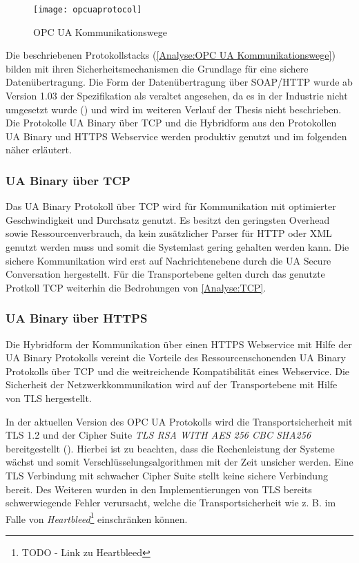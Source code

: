 \begin{figure}[h]
  \centering
  \texttt{[image: opcuaprotocol]}
  \caption{OPC UA Kommunikationswege} 
  \label{Analyse:OPC UA Kommunikationswege}
\end{figure}

\clearpage

Die beschriebenen Protokollstacks (\autoref{Analyse:OPC UA Kommunikationswege}) bilden mit ihren Sicherheitsmechanismen die Grundlage für eine sichere Datenübertragung. Die Form der Datenübertragung über \ac{SOAP}/\ac{HTTP} wurde ab Version 1.03 der Spezifikation als veraltet angesehen, da es in der Industrie nicht umgesetzt wurde (\cite{opcpt5}) und wird im weiteren Verlauf der Thesis nicht beschrieben. Die Protokolle \ac{UA} Binary über \ac{TCP} und die Hybridform aus den Protokollen \ac{UA} Binary und \ac{HTTPS} Webservice werden produktiv genutzt und im folgenden näher erläutert.

\subsubsection{\ac{UA} Binary über \ac{TCP}}
Das \ac{UA} Binary Protokoll über \ac{TCP} wird für Kommunikation mit optimierter Geschwindigkeit und Durchsatz genutzt. Es besitzt den geringsten Overhead sowie Ressourcenverbrauch, da kein zusätzlicher Parser für \ac{HTTP} oder \ac{XML} genutzt werden muss und somit die Systemlast gering gehalten werden kann. Die sichere Kommunikation wird erst auf Nachrichtenebene durch die \ac{UA} Secure Conversation hergestellt. Für die Transportebene gelten durch das genutzte Protkoll \ac{TCP} weiterhin die Bedrohungen von \autoref{Analyse:TCP}.

\subsubsection{\ac{UA} Binary über \ac{HTTPS}}
Die Hybridform der Kommunikation über einen \ac{HTTPS} Webservice mit Hilfe der \ac{UA} Binary Protokolls vereint die Vorteile des Ressourcenschonenden \ac{UA} Binary Protokolls über \ac{TCP} und die weitreichende Kompatibilität eines Webservice. Die Sicherheit der Netzwerkkommunikation wird auf der Transportebene mit Hilfe von \ac{TLS} hergestellt.

In der aktuellen Version des \ac{OPC UA} Protokolls wird die Transportsicherheit mit \ac{TLS} 1.2 und der Cipher Suite \textit{TLS RSA WITH AES 256 CBC SHA256} bereitgestellt (\cite{opcpt7}). Hierbei ist zu beachten, dass die Rechenleistung der Systeme wächst und somit Verschlüsselungsalgorithmen mit der Zeit unsicher werden. Eine \ac{TLS} Verbindung mit schwacher Cipher Suite stellt keine sichere Verbindung bereit. Des Weiteren wurden in den Implementierungen von \ac{TLS} bereits schwerwiegende Fehler verursacht, welche die Transportsicherheit wie z. B. im Falle von \textit{Heartbleed}\footnote{TODO - Link zu Heartbleed} einschränken können.

